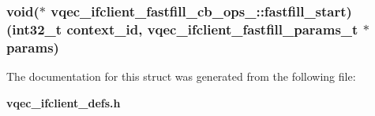 \subsubsection{\setlength{\rightskip}{0pt plus 5cm}void($\ast$ \bf{vqec\_\-ifclient\_\-fastfill\_\-cb\_\-ops\_\-::fastfill\_\-start})(int32\_\-t context\_\-id, \bf{vqec\_\-ifclient\_\-fastfill\_\-params\_\-t} $\ast$params)}\label{structvqec__ifclient__fastfill__cb__ops___8b47e069d26df9aeb29a6c7d3e696625}




The documentation for this struct was generated from the following file:\begin{CompactItemize}
\item 
\bf{vqec\_\-ifclient\_\-defs.h}\end{CompactItemize}
